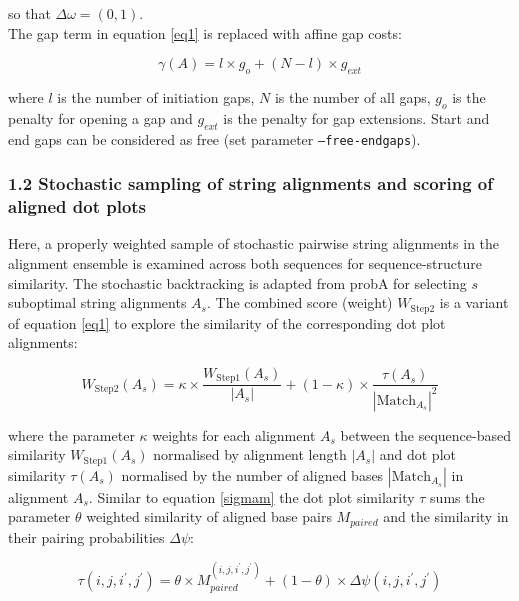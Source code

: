 \documentclass{bmcart}
\begin{document}
\noindent so that $\Delta \omega = (0,1)$. \\

The gap term in equation \ref{eq1} is replaced with affine gap costs:

\begin{equation}\label{eq6}
	\gamma(A) = l \times g_o + (N-l) \times g_{ext}
\end{equation}
	
\noindent where $l$ is the number of initiation gaps, $N$ is the number of all gaps,
$g_o$ is the penalty for opening a gap and $g_{ext}$ is the penalty for gap
extensions. Start and end gaps can be considered as free (set parameter \texttt{--free-endgaps}). \\

\subsubsection*{1.2 Stochastic sampling of string alignments and scoring of aligned dot plots}

Here, a properly weighted sample of stochastic pairwise string alignments
in the alignment ensemble is examined across both sequences for sequence-structure similarity.
The stochastic backtracking is adapted from probA \cite{Muckstein12385998} for
selecting $s$ suboptimal string alignments $A_s$.  The combined score (weight)
$W_{\mbox{Step2}}$ is a variant of equation \ref{eq1} to explore the similarity
of the corresponding dot plot alignments:

\begin{equation}\label{eq7}
	W_{\mbox{Step2}}(A_s) = \kappa \times \frac{W_{\mbox{Step1}}(A_s)}{|A_s|} + (1-\kappa) \times
	\frac{\tau(A_s)}{{|\mbox{Match}_{A_s}|}^2}
\end{equation}

\noindent where the parameter $\kappa$ weights for each alignment $A_s$ between the
sequence-based similarity $W_{\mbox{Step1}}(A_s)$ normalised by alignment
length $|A_s|$ and dot plot similarity $\tau(A_s)$ normalised by the number of
aligned bases $|\mbox{Match}_{A_s}|$ in alignment $A_s$. Similar to equation
\ref{sigmam} the dot plot similarity $\tau$ sums the parameter $\theta$ weighted
similarity of aligned base pairs $M_{paired}$ and the similarity in their
pairing probabilities $\Delta \psi$:

\begin{equation}\label{eq8}
	\tau(i,j,i^\prime,j^\prime) = \theta \times M_{paired}^{(i,j,i^\prime,j^\prime)}
	+ (1-\theta) \times \Delta \psi(i,j,i^\prime,j^\prime)
\end{equation}
\end{document}
